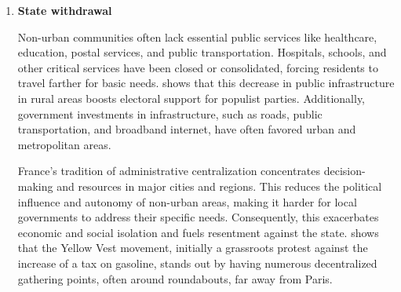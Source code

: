 \begin{enumerate}
In France, \cite{Lebras2022} identifies a historical division between two Middle Ages landscapes: the bocage regions in the West and Southwest, characterized by scattered farms and hamlets, and the open-field regions in the Northeast and Mediterranean, where populations concentrate in towns and villages. By the late 20\textsuperscript{th} century, the Northeast faced an industrial decline, while the West experienced industrial growth, particularly in the food sector. Social mobility stagnated in the East after the "thirty glorious years" (J. Fourastié, 1979), leading to deteriorating conditions, social disconnection, and a rise in FN support. Meanwhile, improved connectivity and mobility in the West fostered optimism. This analysis motivated us to include the density of fences (haie) per square kilometer as a measure of bocage areas.\footnote{We used satellite data from the Institut national de l'information géographique et forestière (National Institute of Geographic and Forest Information). See the Data section \ref{data-section} for more information. A measure normalized by agricultural land area rather than total municipal area would capture the bocage character of the countryside more precisely; constructing it would require intersecting the fence layer with municipal land-use data, which is left for future work. Because the two denominators are highly correlated in the rural municipalities that make up the estimation sample, this choice is unlikely to affect the results.}


    \item \textbf{State withdrawal}

Non-urban communities often lack essential public services like healthcare, education, postal services, and public transportation. Hospitals, schools, and other critical services have been closed or consolidated, forcing residents to travel farther for basic needs. \cite{davoine2019} shows that this decrease in public infrastructure in rural areas boosts electoral support for populist parties. Additionally, government investments in infrastructure, such as roads, public transportation, and broadband internet, have often favored urban and metropolitan areas.

France's tradition of administrative centralization concentrates decision-making and resources in major cities and regions. This reduces the political influence and autonomy of non-urban areas, making it harder for local governments to address their specific needs. Consequently, this exacerbates economic and social isolation and fuels resentment against the state. \cite{boyer2020} shows that the Yellow Vest movement, initially a grassroots protest against the increase of a tax on gasoline, stands out by having numerous decentralized gathering points, often around roundabouts, far away from Paris.



\end{enumerate}


